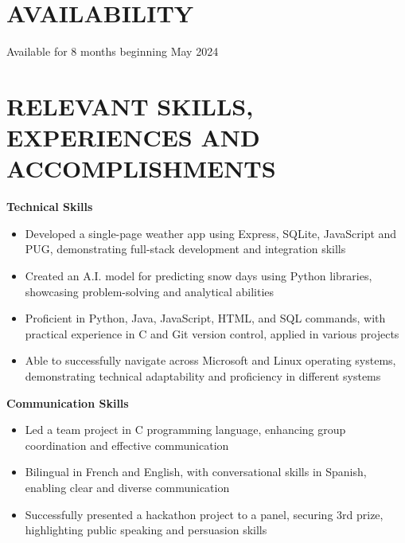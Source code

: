 \documentclass[a4paper,11pt]{article}
\begin{document}
\vspace{2pt}
\section{AVAILABILITY}
	Available for 8 months beginning May 2024\\

\vspace{2pt}
\section{RELEVANT SKILLS, EXPERIENCES AND ACCOMPLISHMENTS }
	\begin{minipage}{\linewidth}
    \textbf{Technical Skills}
    \begin{itemize}
    \item Developed a single-page weather app using Express, SQLite, JavaScript and PUG, demonstrating full-stack development and integration skills
    \item Created an A.I. model for predicting snow days using Python libraries, showcasing problem-solving and analytical abilities
    \item Proficient in Python, Java, JavaScript, HTML, and SQL commands, with practical experience in C and Git version control, applied in various projects
    \item Able to successfully navigate across Microsoft and Linux operating systems, demonstrating technical adaptability and proficiency in different systems 
\end{itemize}
\end{minipage}
\vspace{5pt}

\begin{minipage}{\linewidth}
    \textbf{Communication Skills}
    \begin{itemize}
    \item Led a team project in C programming language, enhancing group coordination and effective communication
    \item Bilingual in French and English, with conversational skills in Spanish, enabling clear and diverse communication
    \item Successfully presented a hackathon project to a panel, securing 3rd prize, highlighting public speaking and persuasion skills 
\end{itemize}
\end{minipage}
\end{document}
